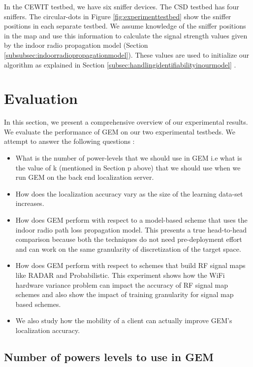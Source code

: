 \documentclass{Localization-PaperWriteupDraft}
\begin{document}
In the CEWIT testbed, we have six sniffer devices. The CSD testbed has four sniffers. The circular-dots in Figure \ref{fig:experimenttestbed} show the sniffer positions in each separate testbed. We assume knowledge of the sniffer positions in the map and use this information to calculate the signal strength values given by the indoor radio propagation model (Section \ref{subsubsec:indoorradiopropagationmodel}). These values are used to initialize our algorithm as explained in Section \ref{subsec:handlingidentifiabilityinourmodel} .

\section{Evaluation}
\label{sec:evaluation}

In this section, we present a comprehensive overview of our experimental results. We evaluate the performance of GEM on our two experimental testbeds. We attempt to answer the following questions :

\begin{itemize}

\item What is the number of power-levels that we should use in GEM i.e what is the value of k (mentioned in Section p above) that we should use when we run GEM on the back end localization server. 
\item How does the localization accuracy vary as the size of the learning data-set increases.
\item How does GEM perform with respect to a model-based scheme that uses the indoor radio path loss propagation model. This presents a true head-to-head comparison because both the techniques do not need pre-deployment effort and can work on the same granularity of discretization of the target space.
\item How does GEM perform with respect to schemes that build RF signal maps like RADAR and Probabilistic. This experiment shows how the WiFi hardware variance problem can impact the accuracy of RF signal map schemes and also show the impact of training granularity for signal map based schemes.
\item We also study how the mobility of a client can actually improve GEM's localization accuracy. 

\end{itemize}

\subsection{Number of powers levels to use in GEM}
\label{subsec:numberofpowerlevelstouseingem}
\end{document}
